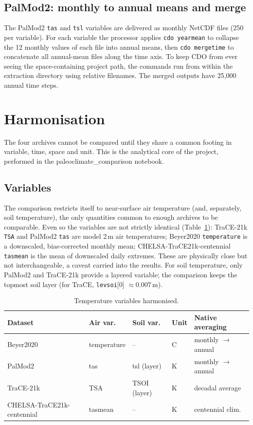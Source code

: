 \documentclass{isprs}
\newcommand{\degC}{\textdegree C}
\newcommand{\tabbr}[1]{\texttt{#1}}
\begin{document}
\subsection{PalMod2: monthly to annual means and merge}
The PalMod2 \tabbr{tas} and \tabbr{tsl} variables are delivered as monthly NetCDF files (250 per variable). For each variable the processor applies \tabbr{cdo yearmean} to collapse the 12 monthly values of each file into annual means, then \tabbr{cdo mergetime} to concatenate all annual-mean files along the time axis. To keep CDO from ever seeing the space-containing project path, the commands run from within the extraction directory using relative filenames. The merged outputs have 25,000 annual time steps.

\section{Harmonisation}
The four archives cannot be compared until they share a common footing in variable, time, space and unit. This is the analytical core of the project, performed in the paleoclimate\_comparison notebook. \cite{giersch2026_paleoclimate_model_comparison}

\subsection{Variables}
The comparison restricts itself to near-surface air temperature (and, separately, soil temperature), the only quantities common to enough archives to be comparable. Even so the variables are not strictly identical (Table~\ref{tab:vars}): TraCE-21k \tabbr{TSA} and PalMod2 \tabbr{tas} are model 2\,m air temperatures; Beyer2020 \tabbr{temperature} is a downscaled, bias-corrected monthly mean; CHELSA-TraCE21k-centennial \tabbr{tasmean} is the mean of downscaled daily extremes. These are physically close but not interchangeable, a caveat carried into the results. For soil temperature, only PalMod2 and TraCE-21k provide a layered variable; the comparison keeps the topmost soil layer (for TraCE, \tabbr{levsoi}[0] $\approx 0.007$\,m).

\begin{table}[t]
\centering
\small
\begin{tabular}{lllll}
\toprule
Dataset   					& Air var.    & Soil var.    & Unit  & Native averaging \\
\midrule
Beyer2020					& temperature & --           & \degC & monthly $\rightarrow$ annual \\
PalMod2						& tas         & tsl (layer)  & K     & monthly $\rightarrow$ annual \\
TraCE-21k 					& TSA         & TSOI (layer) & K     & decadal average \\
CHELSA-TraCE21k-centennial  & tasmean     & --           & K     & centennial clim. \\
\bottomrule
\end{tabular}
\caption{Temperature variables harmonised.}
\label{tab:vars}
\end{table}
\end{document}
